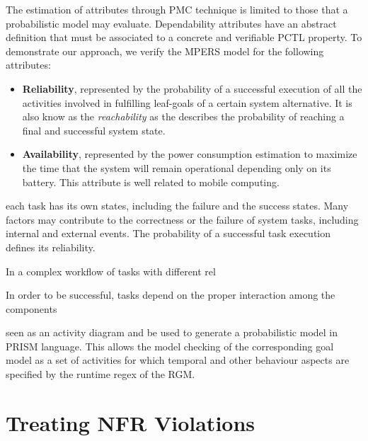 The estimation of attributes through PMC technique is limited to those that a probabilistic model may evaluate. Dependability attributes have an abstract definition that must be associated to a concrete and verifiable PCTL property. To demonstrate our approach, we verify the MPERS model for the following attributes:

\begin{itemize}

\item \textbf{Reliability}, represented by the probability of a successful execution of all the activities involved in fulfilling leaf-goals of a certain system alternative. It is also know as the \textit{reachability} as the describes the probability of reaching a final and successful system state. 
\bigskip

\item \textbf{Availability}, represented by the power consumption estimation to maximize the time that the system will remain operational depending only on its battery. This attribute is well related to mobile computing. 
\medskip

\end{itemize}


each task has its own states, including the failure and the success states. Many factors may contribute to the correctness or the failure of system tasks, including internal and external events. The probability of a successful task execution defines its reliability. 

In a complex workflow of tasks with different rel 

In order to be successful, tasks depend on the proper interaction among the components 

seen as an activity diagram and be used to generate a probabilistic model in PRISM language. This allows the model checking of the corresponding goal model as a set of activities for which temporal and other behaviour aspects are specified by the runtime regex of the RGM.

\section{Treating NFR Violations}

